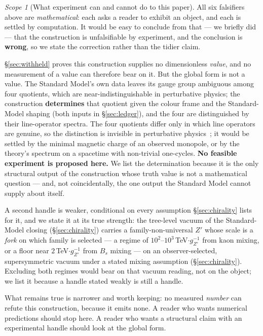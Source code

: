 \documentclass[11pt,a4paper]{article}
\theoremstyle{definition}
\theoremstyle{remark}
\newtheorem{scopenote}{Scope}
\begin{document}
\begin{scopenote}[What experiment can and cannot do to this paper]
All six falsifiers above are \emph{mathematical}: each asks a reader to exhibit an object,
and each is settled by computation. It would be easy to conclude from that --- we briefly did ---
that the construction is unfalsifiable by experiment, and the conclusion is \textbf{wrong}, so we
state the correction rather than the tidier claim.

\S\ref{sec:withheld} proves this construction supplies no dimensionless \emph{value}, and no
measurement of a value can therefore bear on it. But the global form is not a value. The Standard
Model's own data leaves its gauge group ambiguous among four quotients, which are
near-indistinguishable in perturbative physics; the construction \textbf{determines} that quotient given the colour frame and the Standard-Model shaping (both inputs
in \S\ref{sec:ledger}), and the four are distinguished by their line-operator spectra. The four quotients differ only in which line operators are genuine, so the distinction is invisible in perturbative
physics~\cite{tong,ast}; it would be settled by the minimal magnetic charge of an observed monopole, or by the theory's
spectrum on a spacetime with non-trivial one-cycles. \textbf{No feasible experiment is proposed here.} We list the
determination because it is the only structural output of the construction whose truth value is not a mathematical
question --- and, not coincidentally, the one output the Standard Model cannot supply about itself.

A second handle is weaker, conditional on every assumption \S\ref{sec:chirality} lists for it, and we state it at its true strength: the tree-level vacuum of the Standard-Model
closing (\S\ref{sec:chirality}) carries a family-non-universal $Z'$ whose scale is a \emph{fork} on which family
is selected --- a regime of $10^2$--$10^3$\,TeV$\cdot g_{Z'}^{-1}$ from kaon mixing, or a floor near $2$\,TeV$\cdot g_{Z'}^{-1}$
from $B_s$ mixing --- on an observer-selected, supersymmetric vacuum under a stated mixing assumption (\S\ref{sec:chirality}).
Excluding both regimes would bear on that vacuum reading, not on the object; we list it because a handle stated
weakly is still a handle.

What remains true is narrower and worth keeping: no measured \emph{number} can refute this
construction, because it emits none. A reader who wants numerical predictions should stop here. A
reader who wants a structural claim with an experimental handle should look at the global form.
\end{scopenote}
\end{document}
